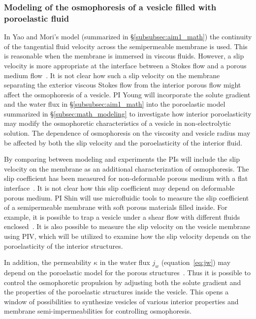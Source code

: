 \documentclass[11pt]{article}
\begin{document}
 
\subsubsection{Modeling of the osmophoresis of a vesicle filled with
poroelastic fluid}
\label{subsec:math_model_porous_vesicle}
In Yao and Mori's model (summarized in \S \ref{subsubsec:aim1_math}) the
continuity of the tangential fluid velocity across the semipermeable
membrane is used.  This is reasonable when the membrane is immersed in
viscous fluids.  However, a slip velocity is more appropriate at the
interface between a Stokes flow and a porous medium
flow~\cite{MacMinn2016_PRApplied, Angot2017_PRE}.  It is not clear how
such a slip velocity on the membrane separating the exterior viscous
Stokes flow from the interior porous flow might affect the osmophoresis
of a vesicle.  PI Young will incorporate the solute gradient and the
water flux in \S\ref{subsubsec:aim1_math} into the poroelastic model
summarized in \S\ref{subsec:math_modeling} to investigate how interior
poroelasticity may modify the osmophoretic characteristics of a vesicle
in non-electrolytic solution. The dependence of osmophoresis on the
viscosity and vesicle radius may be affected by both the slip velocity
and the poroelasticity of the interior fluid. 

By comparing between modeling and experiments the PIs will include the
slip velocity on the membrane as an additional characterization of
osmophoresis. The slip coefficient has been measured for non-deformable
porous medium with a flat interface~\cite{BeaversJoseph1967_JFM,
LaugaBrennerStone2007_chapter19,  LaugaStone2003_JFM}.  It is not clear
how this slip coefficient may depend on deformable porous medium. PI
Shin will use microfluidic tools to measure the slip coefficient of a
semipermeable membrane with soft porous materials filled inside. For
example, it is possible to trap a vesicle under a shear flow with
different fluids enclosed~\cite{shin2015}. It is also possible to
measure the slip velocity on the vesicle membrane using PIV,
 which will be utilized to examine how the
slip velocity depends on the poroelasticity of the interior structures.

In addition, the permeability $\kappa$ in the water flux $j_w$
(equation~\eqref{eq:jw}) may depend on the poroelastic model for the
porous structures~\cite{MacMinn2016_PRApplied}.  Thus it is possible to
control the osmophoretic propulsion by adjusting both the solute
gradient and the  properties of the poroelastic structures inside the
vesicle. This opens a window of possibilities to synthesize vesicles of
various interior properties and membrane semi-impermeabilities for
controlling osmophoresis.
\end{document}

